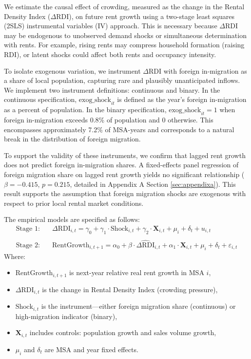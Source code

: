 \documentclass[APA,Times1COL]{WileyNJDv5} %
\begin{document}
We estimate the causal effect of crowding, measured as the change in the Rental Density Index (\(\Delta \text{RDI}\)), on future rent growth using a two-stage least squares (2SLS) instrumental variables (IV) approach. This is necessary because \(\Delta \text{RDI}\) may be endogenous to unobserved demand shocks or simultaneous determination with rents. For example, rising rents may compress household formation (raising RDI), or latent shocks could affect both rents and occupancy intensity.

To isolate exogenous variation, we instrument \(\Delta \text{RDI}\) with foreign in-migration as a share of local population, capturing rare and plausibly unanticipated inflows. We implement two instrument definitions: continuous and binary. In the continuous specification, \(\text{exog\_shock}_{it}\) is defined as the year's foreign in-migration as a percent of population. In the binary specification, \(\text{exog\_shock}_{it} = 1\) when foreign in-migration exceeds 0.8\% of population and 0 otherwise. This encompasses approximately 7.2\% of MSA-years and corresponds to a natural break in the distribution of foreign migration. 

To support the validity of these instruments, we confirm that lagged rent growth does not predict foreign in-migration shares. A fixed-effects panel regression of foreign migration share on lagged rent growth yields no significant relationship ($\beta = -0.415$, $p = 0.215$, detailed in Appendix A Section \ref{sec:appendixa}). This result supports the assumption that foreign migration shocks are exogenous with respect to prior local rental market conditions.

The empirical models are specified as follows:
\begin{align*}
	\text{Stage 1:} \quad & \Delta \text{RDI}_{i,t} = \gamma_0 + \gamma_1 \cdot \text{Shock}_{i,t} + \gamma_2 \cdot \mathbf{X}_{i,t} + \mu_i + \delta_t + u_{i,t} \\\\
	\text{Stage 2:} \quad & \text{RentGrowth}_{i,t+1} = \alpha_0 + \beta \cdot \widehat{\Delta \text{RDI}}_{i,t} + \alpha_1 \cdot \mathbf{X}_{i,t} + \mu_i + \delta_t + \varepsilon_{i,t}
\end{align*}
Where:
\begin{itemize}
	\item $\text{RentGrowth}_{i,t+1}$ is next-year relative real rent growth in MSA $i$,
	\item $\Delta \text{RDI}_{i,t}$ is the change in Rental Density Index (crowding pressure),
	\item $\text{Shock}_{i,t}$ is the instrument—either foreign migration share (continuous) or high-migration indicator (binary),
	\item $\mathbf{X}_{i,t}$ includes controls: population growth and sales volume growth,
	\item $\mu_i$ and $\delta_t$ are MSA and year fixed effects.
\end{itemize}
\end{document}
